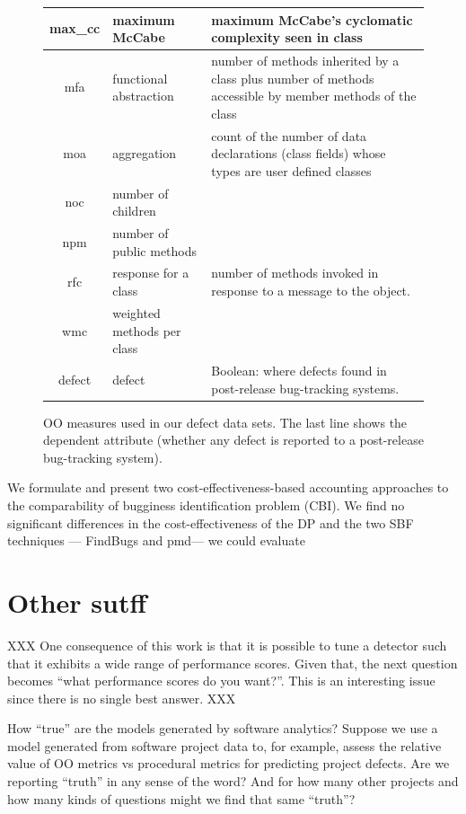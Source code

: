 \documentclass{sig-alternative}
\begin{document}
\begin{figure}[!t]
\begin{center}
{\begin{tabular}{c|l|p{4in}}
max\_cc & maximum McCabe & maximum McCabe's cyclomatic complexity seen
in class\\\hline
mfa & functional abstraction & number of methods inherited by a class
plus number of methods accessible by member methods of the
class\\\hline
moa &  aggregation &  count of the number of data declarations (class
fields) whose types are user defined classes\\\hline
noc &  number of children &\\\hline
npm & number of public methods & \\\hline
rfc & response for a class &number of  methods invoked in response to
a message to the object.\\\hline
wmc & weighted methods per class &\\\hline
\rowcolor{lightgray}
defect & defect & Boolean: where defects found in post-release bug-tracking systems.
\end{tabular}
}
\end{center}
\caption{OO measures used in our defect data sets. The last line shows
the dependent attribute (whether any defect is reported to  a
post-release bug-tracking system).}\label{fig:ck}
\end{figure}

We formulate and present two cost-effectiveness-based
accounting approaches to the comparability of bugginess
identification problem (CBI).
We find no significant differences in the cost-effectiveness
of the DP and the two SBF techniques —
FindBugs and pmd— we could evaluate


\section{Other sutff}
XXX One consequence of this work is that it is possible to tune a detector such that it exhibits a wide range of performance scores. Given that, the next question becomes ``what performance scores do you want?''. This is an interesting issue since there is no single best answer. XXX

How ``true'' are the  models generated by software analytics?
Suppose we use a model generated from software project data to, for example,
assess the relative value of OO metrics vs procedural metrics for predicting
project defects. Are we reporting ``truth'' in any sense of the word? And for how
many other projects  and how many kinds of questions might we find that same ``truth''? 
\end{document}
